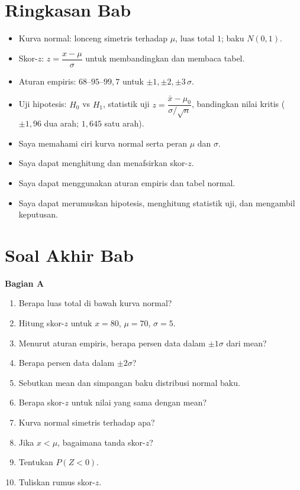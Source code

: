 \documentclass[11pt,a4paper]{report}
\theoremstyle{gaya}
\newcommand{\bagiansoal}[2]{%
  \par\medskip\noindent
  {\large\bfseries\color{biru}Bagian #1}\par\smallskip
  \addcontentsline{toc}{subsection}{Bagian #1}}
\newcommand{\cek}{\ding{113}\ } %
\begin{document}
\section*{Ringkasan Bab}
\begin{itemize}[leftmargin=*,topsep=2pt]
  \item Kurva normal: lonceng simetris terhadap $\mu$, luas total $1$; baku $N(0,1)$.
  \item Skor-$z$: $z=\dfrac{x-\mu}{\sigma}$ untuk membandingkan dan membaca tabel.
  \item Aturan empiris: $68$--$95$--$99{,}7$ untuk $\pm1,\pm2,\pm3\,\sigma$.
  \item Uji hipotesis: $H_0$ vs $H_1$, statistik uji $z=\dfrac{\bar x-\mu_0}{\sigma/\sqrt n}$, bandingkan nilai kritis ($\pm1{,}96$ dua arah; $1{,}645$ satu arah).
\end{itemize}

\begin{refleksi}
\begin{itemize}[leftmargin=*,topsep=2pt]
  \item[\cek] Saya memahami ciri kurva normal serta peran $\mu$ dan $\sigma$.
  \item[\cek] Saya dapat menghitung dan menafsirkan skor-$z$.
  \item[\cek] Saya dapat menggunakan aturan empiris dan tabel normal.
  \item[\cek] Saya dapat merumuskan hipotesis, menghitung statistik uji, dan mengambil keputusan.
\end{itemize}
\end{refleksi}

\section*{Soal Akhir Bab \thechapter}

\bagiansoal{A}{(Fundamental --- setara SNBT Dasar)}
\begin{enumerate}[leftmargin=*]
  \item Berapa luas total di bawah kurva normal?
  \item Hitung skor-$z$ untuk $x=80$, $\mu=70$, $\sigma=5$.
  \item Menurut aturan empiris, berapa persen data dalam $\pm1\sigma$ dari mean?
  \item Berapa persen data dalam $\pm2\sigma$?
  \item Sebutkan mean dan simpangan baku distribusi normal baku.
  \item Berapa skor-$z$ untuk nilai yang sama dengan mean?
  \item Kurva normal simetris terhadap apa?
  \item Jika $x<\mu$, bagaimana tanda skor-$z$?
  \item Tentukan $P(Z<0)$.
  \item Tuliskan rumus skor-$z$.
\end{enumerate}
\end{document}
